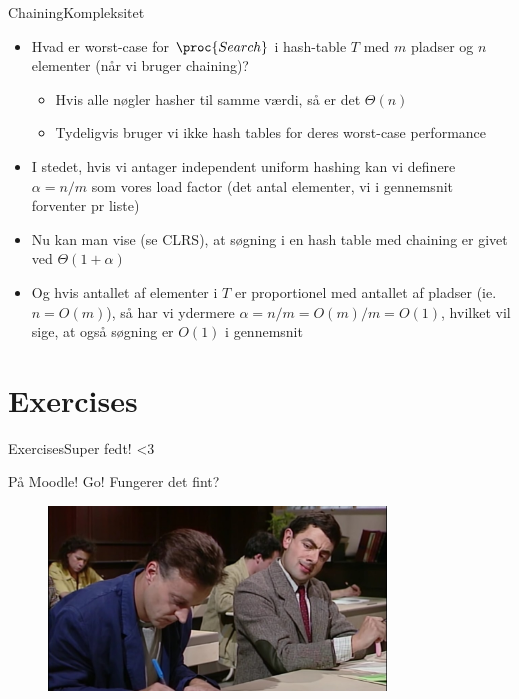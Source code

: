 \documentclass[aspectratio=1610]{beamer}
\begin{document}
\begin{frame}{Chaining}{Kompleksitet}
    \begin{itemize}[<+->]
        \item Hvad er worst-case for $\proc{Search}$ i hash-table $T$ med $m$
            pladser og $n$ elementer (når vi bruger chaining)?
            \begin{itemize}
                \item Hvis alle nøgler hasher til samme værdi, så er det $\Theta(n)$
                \item Tydeligvis bruger vi ikke hash tables for deres worst-case
                    performance
            \end{itemize}
        \item I stedet, hvis vi antager \alert{independent uniform hashing} kan
            vi definere $\alpha = n/m$ som vores \alert{load factor} (det antal
            elementer, vi i gennemsnit forventer pr liste)
        \item Nu kan man vise (se CLRS), at søgning i en hash table med chaining
            er givet ved $\Theta(1 + \alpha)$
        \item Og hvis antallet af elementer i $T$ er proportionel med antallet
            af pladser (ie.\ $n = O(m)$), så har vi ydermere $\alpha = n/m =
            O(m)/m = O(1)$, hvilket vil sige, at også søgning er $O(1)$ i
            gennemsnit
    \end{itemize}
\end{frame}


\section{Exercises}

\begin{frame}{Exercises}{Super fedt! <3}

    På Moodle! Go! Fungerer det fint?

    \begin{figure}[h]
        \centering
        \includegraphics[width=0.8\textwidth]{../exercises}
    \end{figure}
    
\end{frame}
\end{document}
